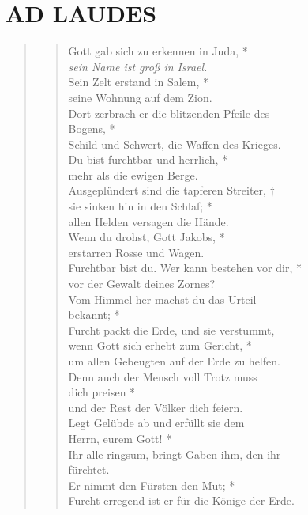 
\section[DONNERSTAG]{AD LAUDES}

\def\greinitialformat#1{{\fontsize{40}{40}\selectfont #1}}
\gresetfirstlineaboveinitial{\small \textcolor{red}{Ps 76}}{}
\setaboveinitialseparation{0.72mm}

\vspace{0.3cm}



\begin{quote}
 


\begin{verse}
Gott gab sich zu erkennen in Juda, *\\
\textit{sein Name ist groß in Israel.}\\
\vin Sein Zelt erstand in Salem, *\\
\vin seine Wohnung auf dem Zion.\\ 
Dort zerbrach er die blitzenden Pfeile des\\ Bogens, *\\
Schild und Schwert, die Waffen des Krieges.\\
\vin Du bist furchtbar und herrlich, *\\
\vin mehr als die ewigen Berge.\\
Ausgeplündert sind die tapferen Streiter, †\\
sie sinken hin in den Schlaf; *\\ 
allen Helden versagen die Hände.\\ 
\vin Wenn du drohst, Gott Jakobs, *\\
\vin erstarren Rosse und Wagen.\\
Furchtbar bist du. Wer kann bestehen vor dir, *\\
vor der Gewalt deines Zornes? \\
\vin Vom Himmel her machst du das Urteil\\ \vin  bekannt; *\\
\vin Furcht packt die Erde, und sie verstummt,\\
wenn Gott sich erhebt zum Gericht, *\\
um allen Gebeugten auf der Erde zu helfen.\\ 
\vin Denn auch der Mensch voll Trotz muss \\ \vin dich preisen *\\
\vin und der Rest der Völker dich feiern.\\
Legt Gelübde ab und erfüllt sie dem\\ Herrn, eurem Gott! *\\
Ihr alle ringsum, bringt Gaben ihm, den ihr\\ fürchtet.\\ 
\vin Er nimmt den Fürsten den Mut; *\\
\vin Furcht erregend ist er für die Könige der Erde.\\



\end{verse}
\end{quote}

